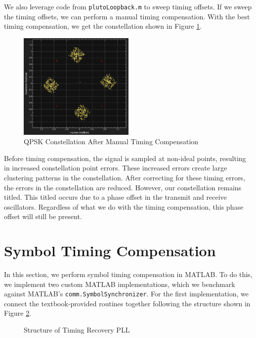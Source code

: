 \documentclass{article}
\begin{document}
\noindent We also leverage code from \texttt{plutoLoopback.m} to sweep timing offsets. If we sweep the timing offsets, we can perform a manual timing compensation. With the best timing compensation, we get the constellation shown in Figure \ref{fig::pluto_constellation_best}.

\begin{figure}[H]
	\centerline{\includegraphics[width=0.5\textwidth]{pluto_constellation_best.png}}
	\caption{QPSK Constellation After Manual Timing Compensation}
	\label{fig::pluto_constellation_best}
\end{figure}

\noindent Before timing compensation, the signal is sampled at non-ideal points, resulting in increased constellation point errors. These increased errors create large clustering patterns in the constellation. After correcting for these timing errors, the errors in the constellation are reduced. However, our constellation remains titled. This titled occurs due to a phase offset in the transmit and receive oscillators. Regardless of what we do with the timing compensation, this phase offset will still be present.

\section{Symbol Timing Compensation}

In this section, we perform symbol timing compensation in MATLAB. To do this, we implement two custom MATLAB implementations, which we benchmark against MATLAB's \texttt{comm.SymbolSynchronizer}. For the first implementation, we connect the textbook-provided routines together following the structure shown in Figure \ref{fig::timing_recovery_block_diagram}.

\begin{figure}[H]
	\centerline{}
	\caption{Structure of Timing Recovery PLL}
	\label{fig::timing_recovery_block_diagram}
\end{figure}
\end{document}
